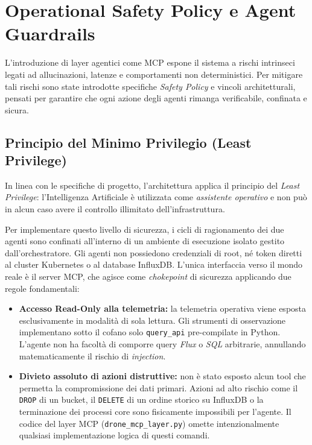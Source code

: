 
\chapter{Operational Safety Policy e Agent Guardrails}
\label{cap:safety_guardrails}

L'introduzione di layer agentici come MCP espone il sistema a rischi intrinseci legati ad allucinazioni, latenze e comportamenti non deterministici. Per mitigare tali rischi sono state introdotte specifiche \textit{Safety Policy} e vincoli architetturali, pensati per garantire che ogni azione degli agenti rimanga verificabile, confinata e sicura.

\section{Principio del Minimo Privilegio (Least Privilege)}
\label{sec:least_privilege}

In linea con le specifiche di progetto, l'architettura applica il principio del \textit{Least Privilege}: l'Intelligenza Artificiale è utilizzata come \emph{assistente operativo} e non può in alcun caso avere il controllo illimitato dell'infrastruttura.

Per implementare questo livello di sicurezza, i cicli di ragionamento dei due agenti sono confinati all'interno di un ambiente di esecuzione isolato gestito dall'orchestratore. Gli agenti non possiedono credenziali di root, né token diretti al cluster Kubernetes o al database InfluxDB. L'unica interfaccia verso il mondo reale è il server MCP, che agisce come \textit{chokepoint} di sicurezza applicando due regole fondamentali:

\begin{itemize}
    \item \textbf{Accesso Read-Only alla telemetria:} la telemetria operativa viene esposta esclusivamente in modalità di sola lettura. Gli strumenti di osservazione implementano sotto il cofano solo \texttt{query\_api} pre-compilate in Python. L'agente non ha facoltà di comporre query \textit{Flux} o \textit{SQL} arbitrarie, annullando matematicamente il rischio di \textit{injection}.
    \item \textbf{Divieto assoluto di azioni distruttive:} non è stato esposto alcun tool che permetta la compromissione dei dati primari. Azioni ad alto rischio come il \texttt{DROP} di un bucket, il \texttt{DELETE} di un ordine storico su InfluxDB o la terminazione dei processi core sono fisicamente impossibili per l'agente. Il codice del layer MCP (\texttt{drone\_mcp\_layer.py}) omette intenzionalmente qualsiasi implementazione logica di questi comandi.
\end{itemize}

